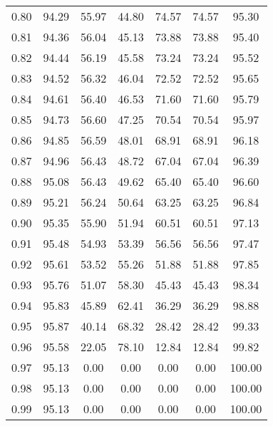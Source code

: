\begin{tabular}{|c|c|c|c|c|c|c|}
      0.80 &     94.29 &     55.97 &      44.80 &   74.57 &      74.57 &         95.30 \\
      0.81 &     94.36 &     56.04 &      45.13 &   73.88 &      73.88 &         95.40 \\
      0.82 &     94.44 &     56.19 &      45.58 &   73.24 &      73.24 &         95.52 \\
      0.83 &     94.52 &     56.32 &      46.04 &   72.52 &      72.52 &         95.65 \\
      0.84 &     94.61 &     56.40 &      46.53 &   71.60 &      71.60 &         95.79 \\
      0.85 &     94.73 &     56.60 &      47.25 &   70.54 &      70.54 &         95.97 \\
      0.86 &     94.85 &     56.59 &      48.01 &   68.91 &      68.91 &         96.18 \\
      0.87 &     94.96 &     56.43 &      48.72 &   67.04 &      67.04 &         96.39 \\
      0.88 &     95.08 &     56.43 &      49.62 &   65.40 &      65.40 &         96.60 \\
      0.89 &     95.21 &     56.24 &      50.64 &   63.25 &      63.25 &         96.84 \\
      0.90 &     95.35 &     55.90 &      51.94 &   60.51 &      60.51 &         97.13 \\
      0.91 &     95.48 &     54.93 &      53.39 &   56.56 &      56.56 &         97.47 \\
      0.92 &     95.61 &     53.52 &      55.26 &   51.88 &      51.88 &         97.85 \\
      0.93 &     95.76 &     51.07 &      58.30 &   45.43 &      45.43 &         98.34 \\
      0.94 &     95.83 &     45.89 &      62.41 &   36.29 &      36.29 &         98.88 \\
      0.95 &     95.87 &     40.14 &      68.32 &   28.42 &      28.42 &         99.33 \\
      0.96 &     95.58 &     22.05 &      78.10 &   12.84 &      12.84 &         99.82 \\
      0.97 &     95.13 &      0.00 &       0.00 &    0.00 &       0.00 &        100.00 \\
      0.98 &     95.13 &      0.00 &       0.00 &    0.00 &       0.00 &        100.00 \\
      0.99 &     95.13 &      0.00 &       0.00 &    0.00 &       0.00 &        100.00 \\
\bottomrule
\end{tabular}
